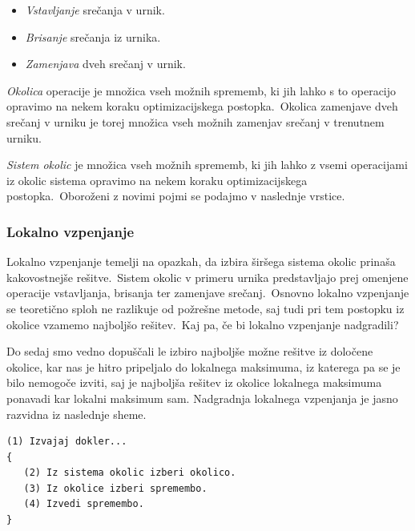 \documentclass[a4paper]{article}
\begin{document}
\begin{itemize}
	\item \emph{Vstavljanje} srečanja v urnik.
   \item \emph{Brisanje} srečanja iz urnika.
   \item \emph{Zamenjava} dveh srečanj v urnik.
\end{itemize}

\noindent
\emph{Okolica} operacije je množica vseh možnih sprememb, ki jih lahko s to operacijo
opravimo na nekem koraku optimizacijskega postopka.\ Okolica zamenjave dveh srečanj v urniku
je torej množica vseh možnih zamenjav srečanj v trenutnem urniku.

\emph{Sistem okolic} je množica vseh možnih sprememb, ki jih lahko z vsemi operacijami iz
okolic sistema opravimo na nekem koraku optimizacijskega postopka.\ Oboroženi z novimi pojmi
se podajmo v naslednje vrstice.

\subsubsection{Lokalno vzpenjanje} %

Lokalno vzpenjanje temelji na opazkah, da izbira širšega sistema okolic prinaša kakovostnejše
rešitve.\ Sistem okolic v primeru urnika predstavljajo prej omenjene operacije vstavljanja,
brisanja ter zamenjave srečanj.\ Osnovno lokalno vzpenjanje se teoretično sploh ne razlikuje
od požrešne metode, saj tudi pri tem postopku iz okolice vzamemo najboljšo rešitev.\ Kaj pa,
če bi lokalno vzpenjanje nadgradili?

Do sedaj smo vedno dopuščali le izbiro najboljše možne rešitve iz določene okolice, kar nas
je hitro pripeljalo do lokalnega maksimuma, iz katerega pa se je bilo nemogoče izviti, saj
je najboljša rešitev iz okolice lokalnega maksimuma ponavadi kar lokalni maksimum sam.
Nadgradnja lokalnega vzpenjanja je jasno razvidna iz naslednje sheme.

\begin{verbatim}
(1) Izvajaj dokler...
{
   (2) Iz sistema okolic izberi okolico.
   (3) Iz okolice izberi spremembo.
   (4) Izvedi spremembo.
}
\end{verbatim}
\end{document}
